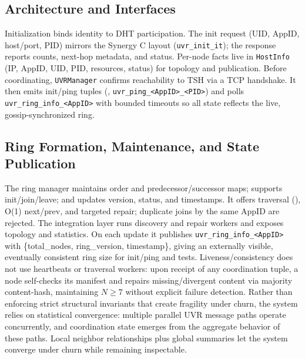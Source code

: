\documentclass[runningheads]{llncs}
\begin{document}
\subsection{Architecture and Interfaces}
Initialization binds identity to DHT participation. The init request (UID, AppID, host/port, PID) mirrors the Synergy C layout (\texttt{uvr\_init\_it}); the response reports counts, next-hop metadata, and status. Per-node facts live in \texttt{HostInfo} (IP, AppID, UID, PID, resources, status) for topology and publication. Before coordinating, \texttt{UVRManager} confirms reachability to TSH via a TCP handshake. It then emits init/ping tuples (\texttt{}, \texttt{uvr\_ping\_<AppID>\_<PID>}) and polls \texttt{uvr\_ring\_info\_<AppID>} with bounded timeouts so all state reflects the live, gossip-synchronized ring.

\subsection{Ring Formation, Maintenance, and State Publication}
The ring manager maintains order and predecessor/successor maps; supports init/join/leave; and updates version, status, and timestamps. It offers traversal (\texttt{}), O(1) next/prev, and targeted repair; duplicate joins by the same AppID are rejected. The integration layer runs discovery and repair workers and exposes topology and statistics. On each update it publishes \texttt{uvr\_ring\_info\_<AppID>} with \{total\_nodes, ring\_version, timestamp\}, giving an externally visible, eventually consistent ring size for init/ping and tests. Liveness/consistency does not use heartbeats or traversal workers: upon receipt of any coordination tuple, a node self-checks its manifest and repairs missing/divergent content via majority content-hash, maintaining \(N\ge 7\) without explicit failure detection. Rather than enforcing strict structural invariants that create fragility under churn, the system relies on statistical convergence: multiple parallel UVR message paths operate concurrently, and coordination state emerges from the aggregate behavior of these paths. Local neighbor relationships plus global summaries let the system converge under churn while remaining inspectable.
\end{document}

